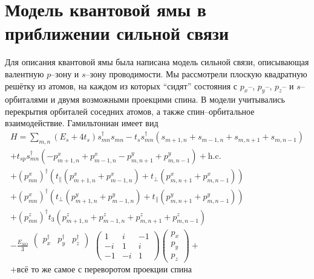 \section{Модель квантовой ямы в приближении сильной связи}
Для описания квантовой ямы была написана модель сильной связи, описывающая
валентную $p$--зону и $s$--зону проводимости. Мы рассмотрели плоскую
квадратную решётку из атомов, на каждом из которых ``сидят'' состояния
с $p_x$--, $p_y$--, $p_z$-- и $s$--орбиталями и двумя 
возможными проекцими спина. В модели учитывались перекрытия
орбиталей соседних атомов, а также спин--орбитальное взаимодействие. 
Гамильтониан имеет вид
\begin{multline}
   \label{well_model_ham}
   H  = \sum_{m,n} (E_s + 4t_s) s_{mn}^{\dagger} s_{mn} - t_s s_{mn}^{\dagger}
                          (s_{m+1,n} + s_{m-1,n} + s_{m,n+1} + s_{m,n-1}) \\
          + t_{sp} s_{mn}^{\dagger} (-p_{m+1,n}^x + p_{m-1,n}^x - p^y_{m,n+1} + p^y_{m,n-1})
                                                                + \mathrm{h.c.}  \\
          + (p_{mn}^x)^{\dagger}(t_{\parallel}(p_{m+1,n}^x + p_{m-1,n}^x) +
                                 t_{\perp} (p^x_{m,n+1} + p^x_{m,n-1})) \\
          + (p_{mn}^x)^{\dagger}(t_{\perp}(p_{m+1,n}^y + p_{m-1,n}^y) +
                                 t_{\parallel} (p^y_{m,n+1} + p^y_{m,n-1})) \\
          + (p_{mn}^z)^{\dagger} t_3 (p_{m+1,n}^z + p_{m-1,n}^z +
                                p^z_{m,n+1} + p^z_{m,n-1}) \\
          -\frac{E_{SO}}{3}
                \begin{matrix}
                    \left(\begin{matrix}
                        p_x^\dagger & p_y^\dagger & p_z^\dagger
                    \end{matrix}\right) \\
                    \\
                    \\
                \end{matrix}
        		\left(\begin{matrix}
        			1 & i & -1 \\
        			-i & 1 & i \\
        			-1 & -i & 1
        		\end{matrix} \right)
                \left(\begin{matrix}
                    p_x \\ 
                    p_y \\
                    p_z
                \end{matrix}\right) + \\
        + \text{всё то же самое с переворотом проекции спина}
\end{multline}
